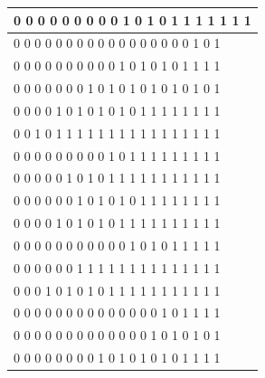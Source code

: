 \documentclass[11pt, a4paper]{article}
\begin{document}
\begin{enumerate}
\begin{table}[http]
\begin{tabular}{|l|}
			0     0     0     0     0     0     0     0     0     1     0     1     0     1     1     1     1     1     1     1 \\ \hline
			0     0     0     0     0     0     0     0     0     0     0     0     0     0     0     0     0     1     0     1 \\ \hline
			0     0     0     0     0     0     0     0     0     0     1     0     1     0     1     0     1     1     1     1 \\ \hline
			0     0     0     0     0     0     0     1     0     1     0     1     0     1     0     1     0     1     0     1 \\ \hline
			0     0     0     0     1     0     1     0     1     0     1     0     1     1     1     1     1     1     1     1 \\ \hline
			0     0     1     0     1     1     1     1     1     1     1     1     1     1     1     1     1     1     1     1 \\ \hline
			0     0     0     0     0     0     0     0     0     1     0     1     1     1     1     1     1     1     1     1 \\ \hline
			0     0     0     0     0     1     0     1     0     1     1     1     1     1     1     1     1     1     1     1 \\ \hline
			0     0     0     0     0     0     1     0     1     0     1     0     1     1     1     1     1     1     1     1 \\ \hline
			0     0     0     0     1     0     1     0     1     0     1     1     1     1     1     1     1     1     1     1 \\ \hline
			0     0     0     0     0     0     0     0     0     0     0     1     0     1     0     1     1     1     1     1 \\ \hline
			0     0     0     0     0     0     1     1     1     1     1     1     1     1     1     1     1     1     1     1 \\ \hline
			0     0     0     1     0     1     0     1     0     1     1     1     1     1     1     1     1     1     1     1 \\ \hline
			0     0     0     0     0     0     0     0     0     0     0     0     0     0     1     0     1     1     1     1 \\ \hline
			0     0     0     0     0     0     0     0     0     0     0     0     0     1     0     1     0     1     0     1 \\ \hline
			0     0     0     0     0     0     0     0     1     0     1     0     1     0     1     0     1     1     1     1 \\ \hline

\end{tabular}
\end{table}
\end{enumerate}
\end{document}
